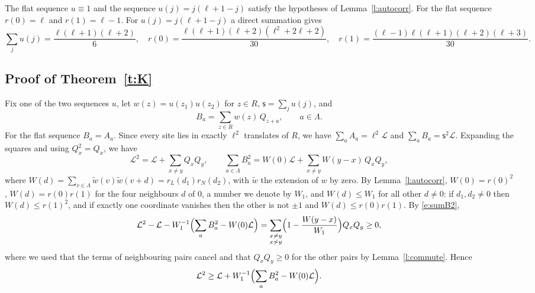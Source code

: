 The flat sequence $u \equiv 1$ and the sequence $u(j) = j(\ell + 1 - j)$ satisfy the hypotheses of Lemma~\ref{l:autocorr}. For the flat sequence $r(0) = \ell$ and $r(1) = \ell - 1$. For $u(j) = j(\ell + 1 - j)$ a direct summation gives
\begin{equation}\label{e:sums}
\sum_{j} u(j) = \frac{\ell(\ell + 1)(\ell + 2)}{6}, \quad r(0) = \frac{\ell(\ell + 1)(\ell + 2)(\ell^2 + 2\ell + 2)}{30}, \quad r(1) = \frac{(\ell - 1)\ell(\ell + 1)(\ell + 2)(\ell + 3)}{30} .
\end{equation}

\subsection{Proof of Theorem~\ref{t:K}}

Fix one of the two sequences $u$, let $w(z) = u(z_1) u(z_2)$ for $z \in R$, $\mathsf s = \sum_j u(j)$, and
\begin{equation*}
B_a = \sum_{z \in R} w(z) \, Q_{z + a}, \qquad a \in \Lambda .
\end{equation*}
For the flat sequence $B_a = A_a$. Since every site lies in exactly $\ell^2$ translates of $R$, we have $\sum_{a} A_a = \ell^2 \mathcal L$ and $\sum_a B_a = \mathsf s^2 \mathcal L$. Expanding the squares and using $Q_x^2 = Q_x$, we have
\begin{equation}\label{e:sumB2}
\mathcal L^2 = \mathcal L + \sum_{x \neq y} Q_x Q_y, \qquad \sum_{a \in \Lambda} B_a^2 = W(0) \mathcal L + \sum_{x \neq y} W(y - x) \, Q_x Q_y,
\end{equation}
where $W(d) = \sum_{v \in \Lambda} \tilde w(v) \tilde w(v + d) = r_L(d_1) r_N(d_2)$, with $\tilde w$ the extension of $w$ by zero. By Lemma~\ref{l:autocorr}, $W(0) = r(0)^2$, $W(d) = r(0) r(1)$ for the four neighbours $d$ of $0$, a number we denote by $W_1$, and $W(d) \le W_1$ for all other $d \neq 0$: if $d_1, d_2 \neq 0$ then $W(d) \le r(1)^2$, and if exactly one coordinate vanishes then the other is not $\pm 1$ and $W(d) \le r(0) r(1)$. By \eqref{e:sumB2},
\begin{equation*}
\mathcal L^2 - \mathcal L - W_1^{-1} \Bigl( \sum_a B_a^2 - W(0) \mathcal L \Bigr) = \sum_{\substack{x \neq y \\ x \not \sim y}} \Bigl( 1 - \frac{W(y - x)}{W_1} \Bigr) Q_x Q_y \ge 0,
\end{equation*}
where we used that the terms of neighbouring pairs cancel and that $Q_x Q_y \ge 0$ for the other pairs by Lemma~\ref{l:commute}. Hence
\begin{equation}\label{e:Lsquare}
\mathcal L^2 \ge \mathcal L + W_1^{-1} \Bigl( \sum_a B_a^2 - W(0) \mathcal L \Bigr).
\end{equation}

